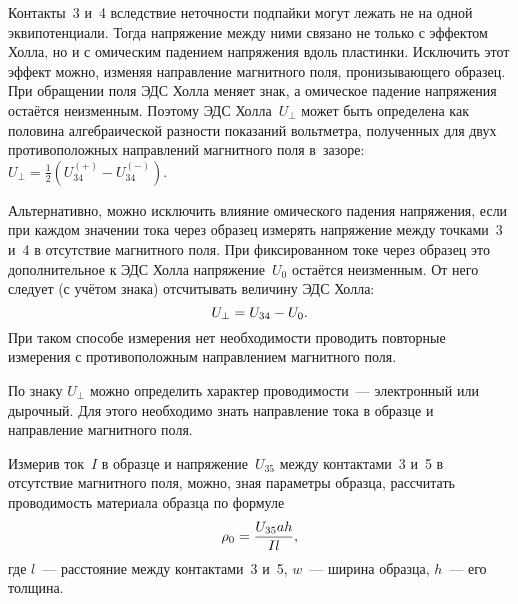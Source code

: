 Контакты~3 и~4 вследствие неточности подпайки могут лежать не на одной
эквипотенциали. Тогда напряжение между ними связано не только с эффектом
Холла, но и с омическим падением напряжения вдоль пластинки. 
Исключить этот эффект можно, изменяя направление магнитного поля, 
пронизывающего образец. 
При обращении поля ЭДС Холла меняет знак, а омическое падение напряжения
остаётся неизменным. Поэтому ЭДС Холла~$U_{\perp}$ может быть определена
как половина алгебраической разности показаний вольтметра, полученных для двух
противоположных направлений магнитного поля в~зазоре:
$U_{\perp} = \frac12 (U_{34}^{(+)}-U_{34}^{(-)})$.

Альтернативно, можно исключить влияние омического падения напряжения, 
если при каждом значении тока через образец измерять напряжение
между точками~3 и~4 в отсутствие магнитного поля. При фиксированном токе через
образец это дополнительное к ЭДС Холла напряжение~$U_0$ остаётся неизменным. 
От него следует (с учётом знака) отсчитывать величину ЭДС Холла:
\begin{equation}
	U_{\perp} = U_{34} - U_0.
	\eqmark{3.4.1}
\end{equation}
При таком способе измерения нет необходимости проводить повторные измерения
с противоположным направлением магнитного поля.

По знаку $U_{\perp}$ можно определить характер проводимости~--- 
электронный или дырочный. Для этого необходимо знать направление тока 
в образце и направление магнитного поля.

Измерив ток~$I$ в образце и напряжение~$U_{35}$ между контактами~3 и~5 в
отсутствие магнитного поля, можно, зная
параметры образца, рассчитать проводимость материала образца по формуле
\begin{equation}
	\rho_0=\frac{U_{35}ah}{Il},
	\eqmark{3.4.2}
\end{equation}
где $l$~--- расстояние между контактами~3 и~5, $w$~--- ширина образца, $h$~---
его толщина.

